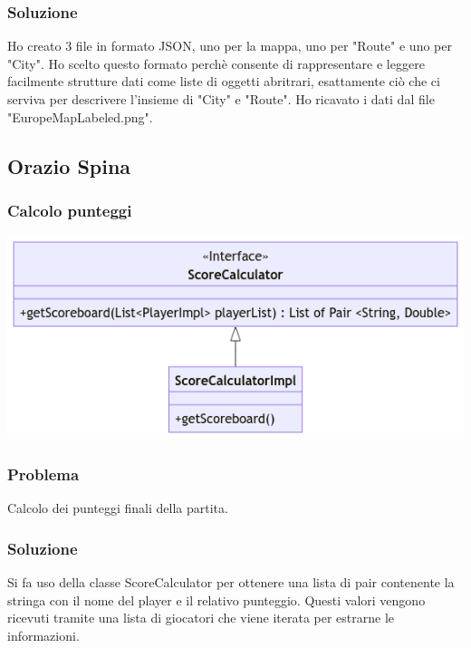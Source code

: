 \documentclass[a4paper,12pt]{report}
\begin{document}
\subsubsection{Soluzione}
Ho creato 3 file in formato JSON, uno per la mappa, uno per "Route" e uno per "City". Ho scelto questo formato perchè consente di rappresentare e leggere facilmente strutture dati come liste di oggetti abritrari, esattamente ciò che ci serviva per descrivere l'insieme di "City" e "Route". Ho ricavato i dati dal file "EuropeMapLabeled.png".
\newpage
\subsection{Orazio Spina}
\subsubsection{Calcolo punteggi}
\begin{center}
\includegraphics[scale=0.7]{scorecalculatorUML.png}
\end{center}

%
\subsubsection{Problema}
Calcolo dei punteggi finali della partita.

%
\subsubsection{Soluzione}
Si fa uso della classe ScoreCalculator per ottenere una lista di pair contenente la stringa con il nome del player e il relativo punteggio. Questi valori vengono ricevuti tramite una lista di giocatori che viene iterata per estrarne le informazioni.
\newpage
\end{document}
